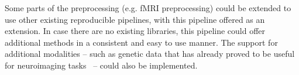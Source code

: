 Some parts of the preprocessing (e.g. fMRI preprocessing) could be extended to use other existing reproducible pipelines, with this pipeline offered as an extension. In case there are no existing libraries, this pipeline could offer additional methods in a consistent and easy to use manner. The support for additional modalities – such as genetic data that has already proved to be useful for neuroimaging tasks~\cite{cole2018brain,parisot2018disease} – could also be implemented.








